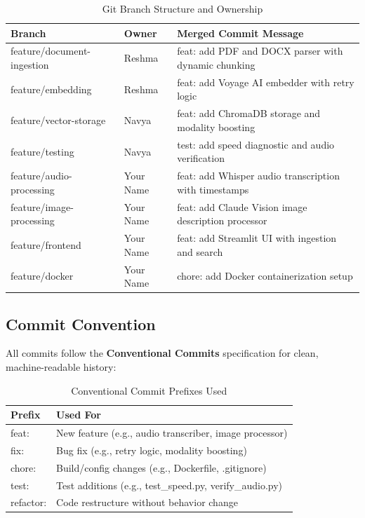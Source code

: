 \documentclass[12pt,a4paper]{report}
\begin{document}
\begin{table}[H]
\centering
\caption{Git Branch Structure and Ownership}
\begin{tabular}{p{5cm}p{2.5cm}p{5.5cm}}
\toprule
\textbf{Branch} & \textbf{Owner} & \textbf{Merged Commit Message} \\
\midrule
feature/document-ingestion & Reshma & feat: add PDF and DOCX parser with dynamic chunking \\
feature/embedding & Reshma & feat: add Voyage AI embedder with retry logic \\
feature/vector-storage & Navya & feat: add ChromaDB storage and modality boosting \\
feature/testing & Navya & test: add speed diagnostic and audio verification \\
feature/audio-processing & Your Name & feat: add Whisper audio transcription with timestamps \\
feature/image-processing & Your Name & feat: add Claude Vision image description processor \\
feature/frontend & Your Name & feat: add Streamlit UI with ingestion and search \\
feature/docker & Your Name & chore: add Docker containerization setup \\
\bottomrule
\end{tabular}
\end{table}

\subsection{Commit Convention}

All commits follow the \textbf{Conventional Commits} specification for clean, machine-readable history:

\begin{table}[H]
\centering
\caption{Conventional Commit Prefixes Used}
\begin{tabular}{ll}
\toprule
\textbf{Prefix} & \textbf{Used For} \\
\midrule
feat: & New feature (e.g., audio transcriber, image processor) \\
fix: & Bug fix (e.g., retry logic, modality boosting) \\
chore: & Build/config changes (e.g., Dockerfile, .gitignore) \\
test: & Test additions (e.g., test\_speed.py, verify\_audio.py) \\
refactor: & Code restructure without behavior change \\
\bottomrule
\end{tabular}
\end{table}
\end{document}
